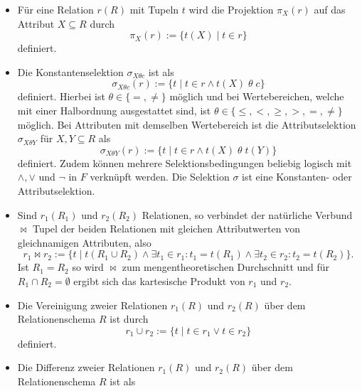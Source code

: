 \begin{itemize}
    \item Für eine Relation $r(R)$ mit Tupeln $t$ wird die Projektion $\pi_X(r)$ auf das Attribut $X \subseteq R$ durch
    \begin{equation*}
        \pi_X(r):=\{t(X) \; | \; t \in r \}
    \end{equation*}
    definiert. 
    \item Die Konstantenselektion $\sigma_{X \theta c}$ ist als
    \begin{equation*}
        \sigma_{X \theta c}(r):=\{t \; | \; t \in r \wedge t(X) \; \theta \; c\}
    \end{equation*}
    definiert.
    Hierbei ist $\theta \in \{=, \neq\}$ möglich und bei Wertebereichen, welche mit einer Halbordnung ausgestattet sind, ist $\theta \in \{\leq, <, \geq, >, = ,\neq\}$ möglich. 
    Bei Attributen mit demselben Wertebereich ist die Attributselektion $\sigma_{X \theta Y}$ für $X, Y \subseteq R$ als
    \begin{equation*}
        \sigma_{X \theta Y}(r):=\{t \; | \; t \in r \wedge t(X) \; \theta \; t(Y)\}
    \end{equation*}    
    definiert. Zudem können mehrere Selektionsbedingungen beliebig logisch mit $\wedge, \vee $ und $\neg$ in $F$ verknüpft werden. Die Selektion $\sigma$ ist eine Konstanten- oder Attributselektion.
    \item Sind $r_1(R_1)$ und $r_2(R_2)$ Relationen, so verbindet der natürliche Verbund $\bowtie$ Tupel der beiden Relationen mit gleichen Attributwerten von gleichnamigen Attributen, also 
    \begin{equation*}
        r_1 \bowtie r_2 := \{t \; | \; t(R_1 \cup R_2) \wedge \exists t_1 \in r_1: t_1=t(R_1) \wedge \exists t_2 \in r_2: t_2=t(R_2)\}.
    \end{equation*} Ist $R_1=R_2$ so wird $\bowtie$ zum mengentheoretischen Durchschnitt und für $R_1 \cap R_2=\emptyset$ ergibt sich das kartesische Produkt von $r_1$ und $r_2$.
    \item Die Vereinigung zweier Relationen $r_1(R)$ und $r_2(R)$ über dem Relationenschema $R$ ist durch
    \begin{equation*}
        r_1 \cup r_2:=\{ t \; | \; t \in r_1 \vee t \in r_2 \}
    \end{equation*}
    definiert.
    \item Die Differenz zweier Relationen $r_1(R)$ und $r_2(R)$ über dem Relationenschema $R$ ist als
    \begin{equation*}

\end{equation*}
\end{itemize}
